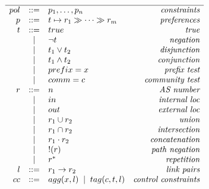 \begin{figure}
  \begin{minipage}[t]{.45\linewidth}
  \vspace*{-1\baselineskip}
  \[ \begin{array}{rclr}
    \hline

     pol     &::=& p_1, \dots, p_n & \textit{constraints} \\
     p       &::=& t \mapsto r_1 \gg \dots \gg r_m & \textit{preferences} \\
     t       &::=& true & \textit{true} \\
         &\;\;|\;\;& \neg t & \textit{negation} \\
         &\;\;|\;\;& t_1 \vee t_2 & \textit{disjunction} \\
         &\;\;|\;\;& t_1 \wedge t_2 & \textit{conjunction} \\
         &\;\;|\;\;& prefix = x & \textit{prefix test} \\
         &\;\;|\;\;& comm = c & \textit{community test} \\
     r       &::=& n & \textit{AS number} \\
         &\;\;|\;\;& in & \textit{internal loc} \\
         &\;\;|\;\;& out & \textit{external loc} \\
         &\;\;|\;\;& r_1 \cup r_2 & \textit{union} \\
         &\;\;|\;\;& r_1 \cap r_2 & \textit{intersection} \\
         &\;\;|\;\;& r_1 \cdot r_2 & \textit{concatenation} \\
         &\;\;|\;\;& !(r) & \textit{path negation} \\
         &\;\;|\;\;& r^* & \textit{repetition} \\
     l       &::=& r_1 \rightarrow r_2 & \textit{link pairs} \\
     cc     &::=& agg(x, l) \;\;|\;\; tag(c, t, l) & \textit{control constraints} \\
  \end{array} \]


\end{minipage}
\end{figure}
